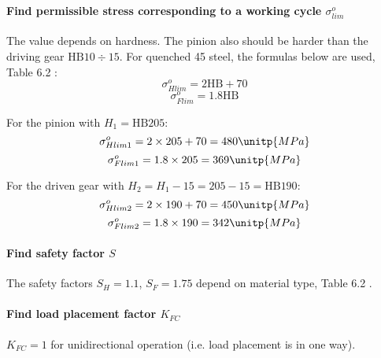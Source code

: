 \paragraph{Find permissible stress corresponding to a working cycle $ \sigma_{lim}^o $}
The value depends on hardness. The pinion also should be harder than the driving gear $ \text{HB} 10 \div 15 $. For quenched 45 steel, the formulas below are used, Table 6.2 \cite{tk1}:
\[ \sigma_{Hlim}^o = 2\text{HB} + 70\]
\[ \sigma_{Flim}^o = 1.8\text{HB}\]

For the pinion with $ H_1=\text{HB}205$:
\[ \sigma_{Hlim1}^o = 2 \times 205 + 70 = 480 \unitp{MPa}\]
\[ \sigma_{Flim1}^o = 1.8\times 205 = 369 \unitp{MPa}\]

For the driven gear with $ H_2=H_1-15=205-15=\text{HB}190 $:
\[ \sigma_{Hlim2}^o = 2 \times 190 + 70 = 450 \unitp{MPa}\]
\[ \sigma_{Flim2}^o = 1.8\times 190 = 342 \unitp{MPa}\]

\paragraph{Find safety factor $ S $}
The safety factors $ S_H=1.1 $, $ S_F=1.75 $ depend on material type, Table 6.2 \cite{tk1}.

\paragraph{Find load placement factor $ K_{FC} $}
$ K_{FC} = 1$ for unidirectional operation (i.e. load placement is in one way).

